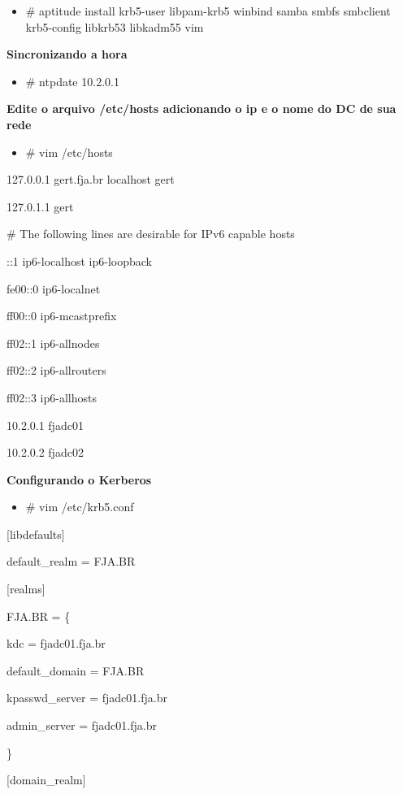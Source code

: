 \begin{itemize}
	\item {\# aptitude install krb5-user libpam-krb5 winbind samba smbfs smbclient krb5-config libkrb53 libkadm55 vim}
\end{itemize}

\textbf{Sincronizando a hora}

\begin{itemize}
	\item {\# ntpdate 10.2.0.1}
\end{itemize}

\textbf{Edite o arquivo /etc/hosts adicionando o ip e o nome do DC de sua rede}

\begin{itemize}
	\item {\# vim /etc/hosts}
\end{itemize}

127.0.0.1       gert.fja.br localhost gert

127.0.1.1       gert

\# The following lines are desirable for IPv6 capable hosts

::1     ip6-localhost ip6-loopback

fe00::0 ip6-localnet

ff00::0 ip6-mcastprefix

ff02::1 ip6-allnodes

ff02::2 ip6-allrouters

ff02::3 ip6-allhosts

10.2.0.1   fjadc01

10.2.0.2   fjadc02

\textbf{Configurando o Kerberos}

\begin{itemize}
	\item {\# vim /etc/krb5.conf}
\end{itemize}

[libdefaults]

	default\_realm = FJA.BR

[realms]

    FJA.BR = \{

      kdc = fjadc01.fja.br

      default\_domain = FJA.BR

      kpasswd\_server = fjadc01.fja.br

      admin\_server = fjadc01.fja.br

     \}

[domain\_realm]

